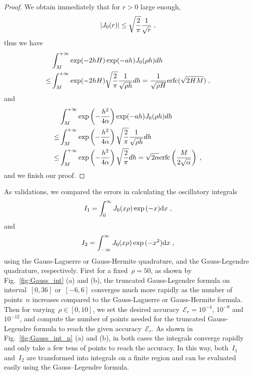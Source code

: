 \begin{proof}
We obtain immediately that for $r>0$ large enough,     
\begin{equation*}
   \left\lvert J_0(r)\right\rvert\leq \sqrt{\frac{2}{\pi}} \frac{1}{\sqrt{r}}\;, 
\end{equation*}
thus we have 
\begin{align*}
   & \int_M^{+\infty}  \exp(-2hH)\exp(-ah)  J_0(\rho h)d h \\
\leq & \int_M^{+\infty}  \exp(-2hH)\sqrt{\frac{2}{\pi}} \frac{1}{\sqrt{\rho h}} d h=\frac{1}{\sqrt{\rho H}}\mathrm{erfc}(\sqrt{2HM})\;,
\end{align*}
and 
\begin{align*}
  &\int_M^{+\infty}  \exp\left(-\frac{h^2}{4\alpha}\right)  \exp(-ah)  J_0(\rho h)d h \\
  \leq &\int_M^{+\infty} \exp\left(-\frac{h^2}{4\alpha}\right)\sqrt{\frac{2}{\pi}} \frac{1}{\sqrt{\rho h}} d h\\ 
  \leq &\int_M^{+\infty} \exp\left(-\frac{h^2}{4\alpha}\right)\sqrt{\frac{2}{\pi}} d h=\sqrt{2\alpha} \mathrm{erfc}\left(\frac{M}{2\sqrt{\alpha}}\right)\;,
\end{align*}
and we finish our proof.
\end{proof}

As validations, we compared the errors in calculating the oscillatory integrals
\begin{equation}\label{eq:I1}
    I_1=\int_0^{\infty} J_0(x \rho) \exp{(-x)} \mathrm{d}x\;,
\end{equation}
and
\begin{equation}\label{eq:I2}
    I_2=\int_{-\infty}^{\infty} J_0(x \rho) \exp{(-x^2)} \mathrm{d}x\;,
\end{equation}
using the Gauss-Laguerre or Gauss-Hermite quadrature, and the Gauss-Legendre quadrature, respectively.
First for a fixed~$\rho = 50$, as shown by Fig.~\ref{fig:Gauss_int} (a) and (b), the truncated Gauss-Legendre formula on interval~$[0, 36]$ or~$[-6, 6]$ converges much more rapidly as the number of points~$n$ increases compared to the Gauss-Laguerre or Gauss-Hermite formula.
Then for varying~$\rho \in [0, 10]$, we set the desired accuracy~$\mathcal{E}_r = 10^{-4}$, $10^{-8}$ and $10^{-12}$, and compute the number of points needed for the truncated Gauss-Legendre formula to reach the given accuracy~$\mathcal{E}_r$.
As shown in Fig.~\ref{fig:Gauss_int_n} (a) and (b), in both cases the integrals converge rapidly and only take a few tens of points to reach the accuracy.
In this way, both~$I_1$ and~$I_2$ are transformed into integrals on a finite region and can be evaluated easily using the Gauss–Legendre formula.

